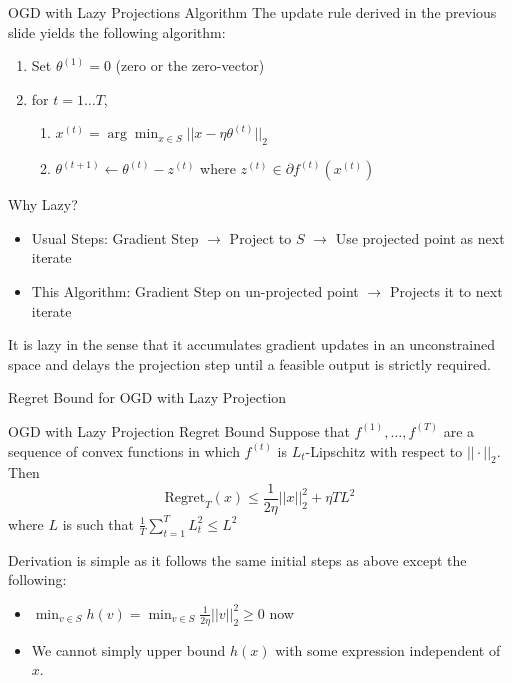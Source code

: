 \begin{frame}{OGD with Lazy Projections Algorithm}
    The update rule derived in the previous slide yields the following algorithm:\pause
    \begin{enumerate}
    \item Set $\theta^{(1)} = 0$ (zero or the zero-vector)
    \item for $t = 1 \ldots T$, \begin{enumerate}
        \item $x^{(t)} = \arg\min_{x \in S} ||x - \eta \theta^{(t)}||_2$
        \item $\theta^{(t+1)} \gets \theta^{(t)} - z^{(t)}$ where $z^{(t)} \in \partial f^{(t)}(x^{(t)})$
    \end{enumerate}
\end{enumerate}
Why Lazy?\begin{itemize}
    \item Usual Steps: Gradient Step $\to$ Project to $S$ $\to$ Use projected point as next iterate
    \item This Algorithm: Gradient Step on un-projected point $\to$ Projects it to next iterate
\end{itemize}
It is lazy in the sense that it accumulates gradient updates in an unconstrained space and delays the projection step until a feasible output is strictly required.
\end{frame}

\begin{frame}{Regret Bound for OGD with Lazy Projection}
    \begin{block}{OGD with Lazy Projection Regret Bound}
    Suppose that $f^{(1)}, \ldots, f^{(T)}$ are a sequence of convex functions in which $f^{(t)}$ is $L_t$-Lipschitz with respect to $||\cdot||_2$. Then
    \begin{equation*}
        \text{Regret}_T(x) \leq \frac{1}{2\eta}||x||_2^2 + \eta TL^2
    \end{equation*}
    where $L$ is such that $\frac{1}{T}\sum_{t=1}^TL_t^2 \leq L^2$
\end{block}
\pause
Derivation is simple as it follows the same initial steps as above except the following:
\begin{itemize}
    \item $\min_{v \in S} h(v) = \min_{v \in S}\frac{1}{2\eta}||v||_2^2 \geq 0$ now
    \item We cannot simply upper bound $h(x)$ with some expression independent of $x$.
\end{itemize}
\end{frame}

